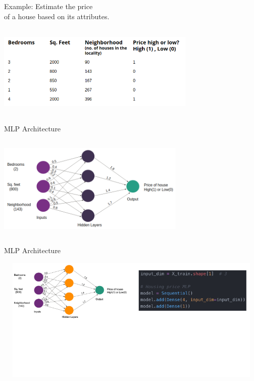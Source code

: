 \documentclass[aspectratio=169,14pt,usenames,dvipsnames]{beamer}
\begin{document}
\begin{frame}{Example: Estimate the price \\ of a house based on its attributes.}
\centering

\includegraphics[width=9.5cm, height=4.5cm]{Keras_Images/Ker_12.png}
\end{frame}

\begin{frame}{MLP Architecture}
\centering

\includegraphics[width=9cm, height=5cm]{Keras_Images/Ker_13.png}
\end{frame}


\begin{frame}{MLP Architecture}

\includegraphics[width=14.5cm, height=6cm]{Keras_Images/Ker_14.png}

\end{frame}
\end{document}
